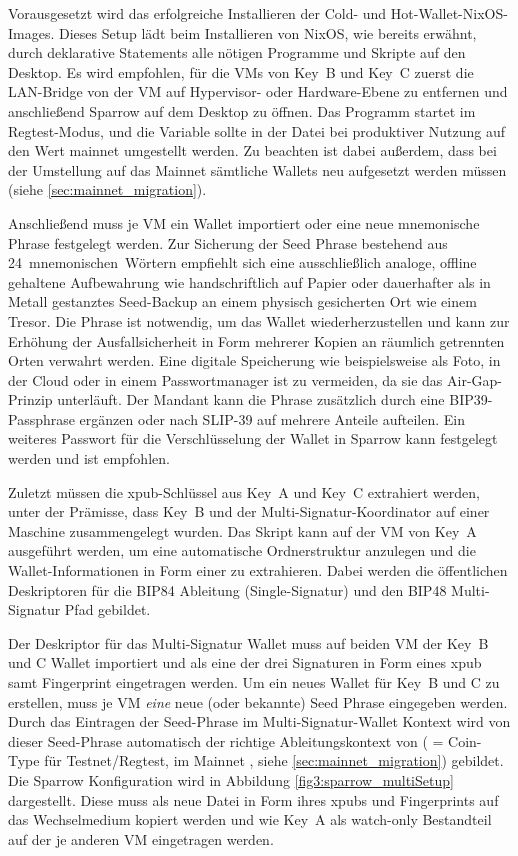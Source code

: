 Vorausgesetzt wird das erfolgreiche Installieren der Cold- und Hot-Wallet-NixOS-Images. Dieses Setup lädt beim Installieren von NixOS, wie bereits erwähnt, durch deklarative Statements alle nötigen Programme und Skripte auf den Desktop.
Es wird empfohlen, für die \acp{VM} von Key~B und Key~C zuerst die \ac{LAN}-Bridge von der \ac{VM} auf Hypervisor- oder Hardware-Ebene zu entfernen und anschließend Sparrow auf dem Desktop zu öffnen. Das Programm startet im Regtest-Modus, und die Variable \texttt{} sollte in der Datei  bei produktiver Nutzung auf den Wert mainnet umgestellt werden. Zu beachten ist dabei außerdem, dass bei der Umstellung auf das Mainnet sämtliche Wallets neu aufgesetzt werden müssen (siehe \ref{sec:mainnet_migration}).

Anschließend muss je \ac{VM} ein Wallet importiert oder eine neue mnemonische Phrase festgelegt werden.
\label{sec:seed_notieren}
Zur Sicherung der Seed Phrase bestehend aus 24~mnemonischen~Wörtern empfiehlt sich eine ausschließlich analoge, offline gehaltene Aufbewahrung wie handschriftlich auf Papier oder dauerhafter als in Metall gestanztes Seed-Backup an einem physisch gesicherten Ort wie einem Tresor. Die Phrase ist notwendig, um das Wallet wiederherzustellen und kann zur Erhöhung der Ausfallsicherheit in Form mehrerer Kopien an räumlich getrennten Orten verwahrt werden. Eine digitale Speicherung wie beispielsweise als Foto, in der Cloud oder in einem Passwortmanager ist zu vermeiden, da sie das Air-Gap-Prinzip unterläuft. Der Mandant kann die Phrase zusätzlich durch eine \ac{BIP}39-Passphrase ergänzen oder nach \ac{SLIP}-39 auf mehrere Anteile aufteilen.
Ein weiteres Passwort für die Verschlüsselung der Wallet in Sparrow kann festgelegt werden und ist empfohlen.

Zuletzt müssen die \ac{xpub}-Schlüssel aus Key~A und Key~C extrahiert werden, unter der Prämisse, dass Key~B und der Multi-Signatur-Koordinator auf einer Maschine zusammengelegt wurden.
Das Skript  kann auf der \ac{VM} von Key~A ausgeführt werden, um eine automatische Ordnerstruktur anzulegen und die Wallet-Informationen in Form einer  zu extrahieren.
Dabei werden die öffentlichen Deskriptoren für die \ac{BIP}84 Ableitung (Single-Signatur) und den \ac{BIP}48 Multi-Signatur Pfad gebildet.

Der Deskriptor für das Multi-Signatur Wallet muss auf beiden \ac{VM} der Key~B und C Wallet importiert und als eine der drei Signaturen in Form eines xpub samt Fingerprint eingetragen werden.
Um ein neues Wallet für Key~B und C zu erstellen, muss je \ac{VM} \emph{eine} neue (oder bekannte) Seed Phrase eingegeben werden. Durch das Eintragen der Seed-Phrase im Multi-Signatur-Wallet Kontext wird von dieser Seed-Phrase automatisch der richtige Ableitungskontext von  ( = Coin-Type für Testnet/Regtest, im Mainnet , siehe \ref{sec:mainnet_migration}) gebildet.
Die Sparrow Konfiguration wird in Abbildung \ref{fig3:sparrow_multiSetup} dargestellt.
Diese muss als neue Datei in Form ihres xpubs und Fingerprints auf das Wechselmedium kopiert werden und wie Key~A als watch-only Bestandteil auf der je anderen \ac{VM} eingetragen werden.


